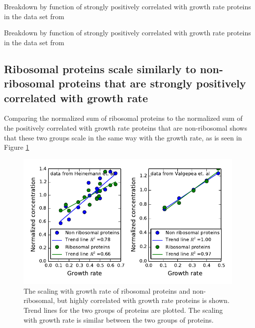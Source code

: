 \documentclass[a4paper]{article}
\begin{document}
\begin{table}[H]
\centering
\caption{\label{tab:corrbreakdownh}
Breakdown by function of strongly positively correlated with growth rate proteins in the data set from \cite{Heinemann2015}}
\end{table}

\begin{table}[H]
\centering
\caption{\label{tab:corrbreakdownv}
Breakdown by function of strongly positively correlated with growth rate proteins in the data set from \cite{Valgepea2013}}
\end{table}

\subsection{Ribosomal proteins scale similarly to non-ribosomal proteins that are strongly positively correlated with growth rate}
Comparing the normalized sum of ribosomal proteins to the normalized sum of the positively correlated with growth rate proteins that are non-ribosomal shows that these two groups scale in the same way with the growth rate, as is seen in Figure \ref{fig:ribsnonribs}


\begin{figure}[H]
\begin{center}
\includegraphics[width=1\columnwidth]{RibsVsGlob.pdf}
\caption{\label{fig:ribsnonribs}
  The scaling with growth rate of ribosomal proteins and non-ribosomal, but highly correlated with growth rate proteins is shown.
Trend lines for the two groups of proteins are plotted.
The scaling with growth rate is similar between the two groups of proteins.
}
\end{center}
\end{figure}
\end{document}

